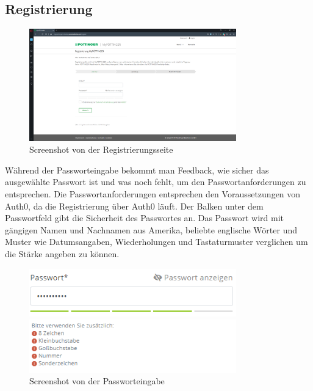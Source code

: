 \subsection{Registrierung}
\begin{figure}[H]
	\centerline{
		\includegraphics[width=0.8\textwidth]{./grafiken/erm_register.png}
	}
	\vskip0pt
	\caption{Screenshot von der Registrierungsseite} \label{fig:register}
\end{figure}
Während der Passworteingabe bekommt man Feedback, wie sicher das ausgewählte Passwort ist und was noch fehlt, um den Passwortanforderungen zu entsprechen. Die Passwortanforderungen entsprechen den Voraussetzungen von Auth0, da die Registrierung über Auth0 läuft. Der Balken unter dem Passwortfeld gibt die Sicherheit des Passwortes an. Das Passwort wird mit gängigen Namen und Nachnamen aus Amerika, beliebte englische Wörter und Muster wie Datumsangaben, Wiederholungen und Tastaturmuster verglichen um die Stärke angeben zu können.
\begin{figure}[H]
	\centerline{
		\includegraphics[width=0.8\textwidth]{./grafiken/passwordSecurity.PNG}
	}
	\vskip0pt
	\centerline{
		\includegraphics[width=0.8\textwidth]{./grafiken/passwordHints.PNG}
	}
	\caption{Screenshot von der Passworteingabe} \label{fig:pw}
\end{figure}
